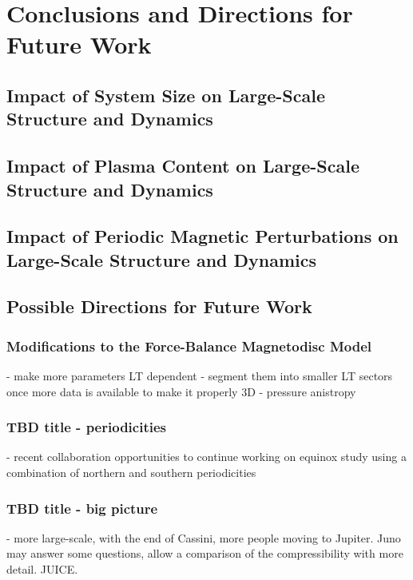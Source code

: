 \chapter{Conclusions and Directions for Future Work}
\label{chap:conclusions}

\section{Impact of System Size on Large-Scale Structure and Dynamics}
\section{Impact of Plasma Content on Large-Scale Structure and Dynamics}
\section{Impact of Periodic Magnetic Perturbations on Large-Scale Structure  and Dynamics}
\section{Possible Directions for Future Work}
\subsection{Modifications to the Force-Balance Magnetodisc Model}
- make more parameters LT dependent
- segment them into  smaller LT sectors once more data  is available to make it properly 3D
- pressure anistropy

\subsection{TBD title - periodicities}
- recent collaboration opportunities to continue working on equinox study using a combination of northern and southern periodicities

\subsection{TBD title - big picture}
- more large-scale, with the end of Cassini, more  people moving  to Jupiter. Juno may answer some questions, allow a comparison of the compressibility with more detail. JUICE.

